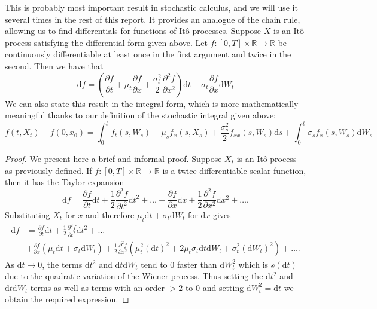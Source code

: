 \begin{lemma}[It\^{o}'s Lemma]
    This is probably most important result in stochastic calculus, and we will use 
    it several times in the rest of this report. It provides an analogue of the 
    chain rule, allowing us to find differentials for functions of It\^{o} processes. 
    Suppose $X$ is an It\^{o} process satisfying the differential form given above. 
    Let $f:[0,T]\times\mathbb{R}\rightarrow\mathbb{R}$ be continuously differentiable 
    at least once in the first argument and twice in the second. Then we have that
    \begin{equation}\label{eq:1.25}
        \mathrm df=\left(\frac{\partial f}{\partial t}+\mu_t\frac{\partial f}{\partial x}+\frac{\sigma_t^2}{2}\frac{\partial^2 f}{\partial x^2}\right)\mathrm dt + \sigma_t\frac{\partial f}{\partial x}\mathrm dW_t
    \end{equation}
    We can also state this result in the integral form, which is more mathematically 
    meaningful thanks to our definition of the stochastic integral given above:
    \begin{equation}\label{eq:1.26}
        f(t,X_t)-f(0,x_0)=\int_0^tf_t(s,W_s)+\mu_sf_x(s,X_s)+\frac{\sigma_s^2}{2}f_{xx}(s,W_s)\mathrm ds+\int_0^t\sigma_sf_x(s,W_s)\mathrm dW_s
    \end{equation}
\end{lemma}
\begin{proof}
    We present here a brief and informal proof. Suppose $X_t$ is an It\^{o} process
    as previously defined. If $f:[0,T]\times\mathbb{R}\rightarrow\mathbb{R}$ is a 
    twice differentiable scalar function, then it has the Taylor expansion
    \begin{equation*}
        \mathrm df = \frac{\partial f}{\partial t}\mathrm dt+\frac{1}{2}\frac{\partial^2f}{\partial t^2}\mathrm dt^2+\dots+\frac{\partial f}{\partial x}\mathrm dx+\frac{1}{2}\frac{\partial^2f}{\partial x^2}\mathrm dx^2+\dots.
    \end{equation*}
    Substituting $X_t$ for $x$ and therefore $\mu_t\mathrm dt + \sigma_t\mathrm dW_t$
    for $\mathrm dx$ gives
    \begin{align*}
        \mathrm df &= \frac{\partial f}{\partial t}\mathrm dt+\frac{1}{2}\frac{\partial^2f}{\partial t^2}\mathrm dt^2+\dots\\
        &+\frac{\partial f}{\partial x}(\mu_t\mathrm dt + \sigma_t\mathrm dW_t)+\frac{1}{2}\frac{\partial^2f}{\partial x^2}(\mu_t^2(\mathrm dt)^2 + 2\mu_t\sigma_t\mathrm dt\mathrm dW_t+ \sigma_t^2(\mathrm dW_t)^2)+\dots.
    \end{align*}
    As $\mathrm dt\rightarrow0$, the terms $\mathrm dt^2$ and $\mathrm dt\mathrm dW_t$ 
    tend to 0 faster than $\mathrm dW_t^2$ which is $\mathcal{o}(\mathrm dt)$ due to
    the quadratic variation of the Wiener process. Thus setting the $\mathrm dt^2$ 
    and $\mathrm dt\mathrm dW_t$ terms as well as terms with an order $>2$ to 0
    and setting $\mathrm dW_t^2=\mathrm dt$ we obtain the required expression.
\end{proof}


